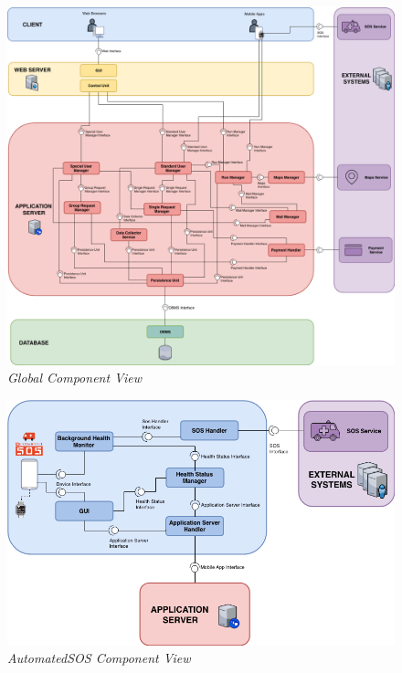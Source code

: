 \begin{figure}[H]
  \begin{center}
  	\includegraphics[width=\textwidth]{./img/GlobalComponent.png}
    \hspace{0.05\linewidth}
    \centering
    \caption{\textit{Global Component View}}
		\label{img:GlobalComponent}
    \end{center}
\end{figure}

\begin{figure}[H]
  \begin{center}
  	\includegraphics[width=\textwidth]{./img/Automated_Component.png}
    \hspace{0.05\linewidth}
    \centering
    \caption{\textit{AutomatedSOS Component View}}
		\label{img:AutomatedComponent}
    \end{center}
\end{figure}

